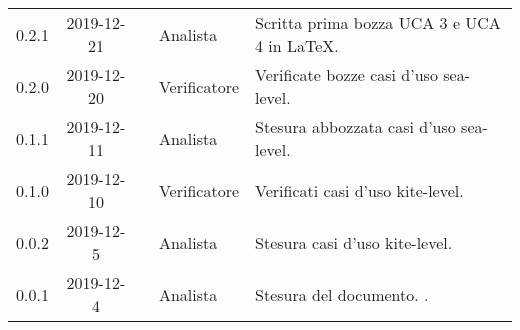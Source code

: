 {\begin{longtable}{ c c  C{4cm}  C{3cm} C{4cm}}
0.2.1 & 2019-12-21 & \PF{} & Analista & Scritta prima bozza UCA 3 e UCA 4 in LaTeX. \\

0.2.0 & 2019-12-20 & \SE{} & Verificatore & Verificate bozze casi d'uso sea-level. \\

0.1.1 & 2019-12-11 & \DF{} & Analista & Stesura abbozzata casi d'uso sea-level. \\

0.1.0 & 2019-12-10 & \BR{} & Verificatore & Verificati casi d'uso kite-level. \\

0.0.2 & 2019-12-5 & \CE{} & Analista & Stesura casi d'uso kite-level. \\

0.0.1 & 2019-12-4 & \CE{} & Analista & Stesura del documento. . \\		
		
\end{longtable}
}